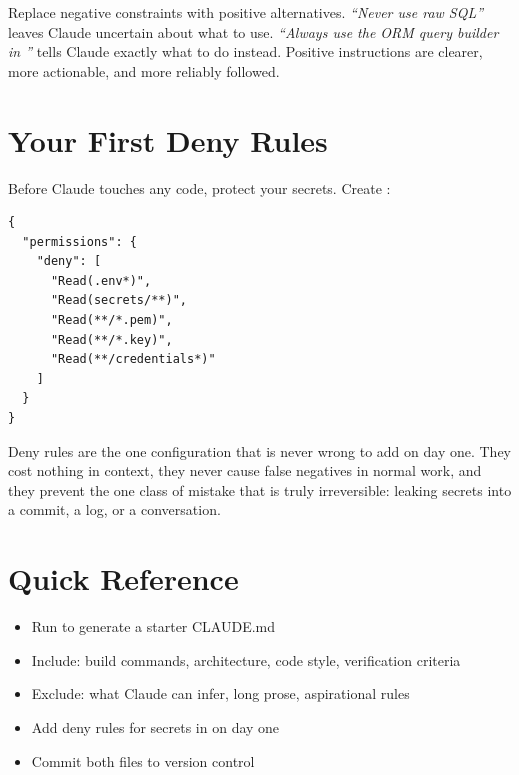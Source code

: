 \begin{tipbox}
Replace negative constraints with positive alternatives.
\emph{``Never use raw SQL''} leaves Claude uncertain about what to use.
\emph{``Always use the ORM query builder in ''} tells
Claude exactly what to do instead.
Positive instructions are clearer, more actionable, and more reliably followed.
\end{tipbox}

\section{Your First Deny Rules}
\label{sec:first-deny}


Before Claude touches any code, protect your secrets.
Create :

\begin{verbatim}
{
  "permissions": {
    "deny": [
      "Read(.env*)",
      "Read(secrets/**)",
      "Read(**/*.pem)",
      "Read(**/*.key)",
      "Read(**/credentials*)"
    ]
  }
}
\end{verbatim}


Deny rules are the one configuration that is never wrong to add on day one.
They cost nothing in context, they never cause false negatives in normal work,
and they prevent the one class of mistake that is truly irreversible:
leaking secrets into a commit, a log, or a conversation.

\section{Quick Reference}

\begin{itemize}
  \item Run  to generate a starter CLAUDE.md
  \item Include: build commands, architecture, code style, verification criteria
  \item Exclude: what Claude can infer, long prose, aspirational rules
  \item Add deny rules for secrets in  on day one
  \item Commit both files to version control
\end{itemize}

